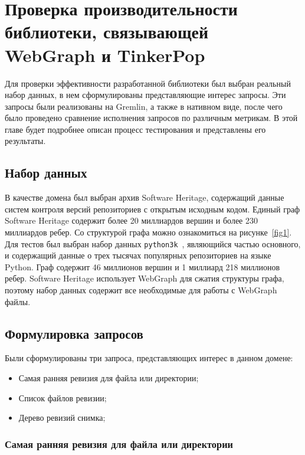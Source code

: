 \documentclass[times,specification,annotation]{itmo-student-thesis}
\begin{document}
\chapter{Проверка производительности библиотеки, связывающей WebGraph и TinkerPop}

Для проверки эффективности разработанной библиотеки был выбран реальный набор данных, в нем сформулированы представляющие интерес запросы. Эти запросы были реализованы на Gremlin, а также в нативном виде, после чего было проведено сравнение исполнения запросов по различным метрикам. В этой главе будет подробнее описан процесс тестирования и представлены его результаты.

\section{Набор данных}

В качестве домена был выбран архив Software Heritage, содержащий данные систем контроля версий репозиториев с открытым исходным кодом. Единый граф Software Heritage содержит более 20 миллиардов вершин и более 230 миллиардов ребер. Со структурой графа можно ознакомиться на рисунке~\ref{fig1}. Для тестов был выбран набор данных \texttt{python3k}~\cite{swh-dataset}, являющийся частью основного, и содержащий данные о трех тысячах популярных репозиториев на языке Python. Граф содержит 46 миллионов вершин и 1 миллиард 218 миллионов ребер. Software Heritage использует WebGraph для сжатия структуры графа, поэтому набор данных содержит все необходимые для работы с WebGraph файлы.

\section{Формулировка запросов}

Были сформулированы три запроса, представляющих интерес в данном домене:

\begin{itemize}
    \item Самая ранняя ревизия для файла или директории;
    \item Список файлов ревизии;
    \item Дерево ревизий снимка;
\end{itemize}

\subsection{Самая ранняя ревизия для файла или директории}
\end{document}
